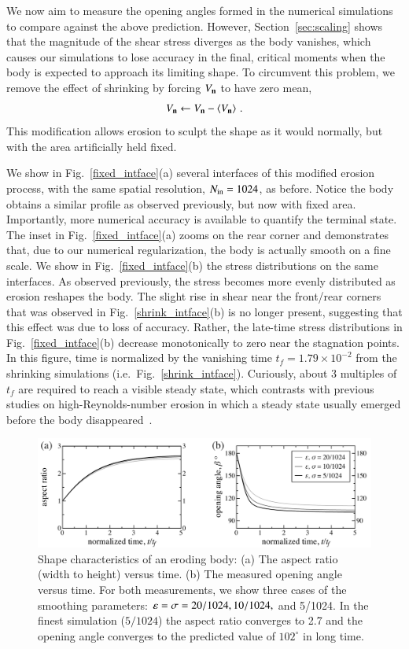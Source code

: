 \documentclass[preprint, 10pt]{elsarticle}
\begin{document}
We now aim to measure the opening angles formed in the numerical simulations to compare against the above prediction. However, Section~\ref{sec:scaling} shows that the magnitude of the shear stress diverges as the body vanishes, which causes our simulations to lose accuracy in the final, critical moments when the body is expected to approach its limiting shape. To circumvent this problem, we remove the effect of shrinking by forcing $V_{\mathbf{n}}$ to have zero mean,
\begin{align}
V_{\mathbf{n}} \leftarrow V_{\mathbf{n}} - \left< V_{\mathbf{n}} \right> \, .
\end{align}
This modification allows erosion to sculpt the shape as it would normally, but with the area artificially held fixed.

We show in Fig.~\ref{fixed_intface}(a) several interfaces of this modified erosion process, with the same spatial resolution, $N_{\mathrm{in}} = 1024$, as before. Notice the body obtains a similar profile as observed previously, but now with fixed area. Importantly, more numerical accuracy is available to quantify the terminal state. The inset in Fig.~\ref{fixed_intface}(a) zooms on the rear corner and demonstrates that, due to our numerical regularization, the body is actually smooth on a fine scale. We show in Fig.~\ref{fixed_intface}(b) the stress distributions on the same interfaces. As observed previously, the stress becomes more evenly distributed as erosion reshapes the body. The slight rise in shear near the front/rear corners that was observed in Fig.~\ref{shrink_intface}(b) is no longer present, suggesting that this effect was due to loss of accuracy. Rather, the late-time stress distributions in Fig.~\ref{fixed_intface}(b) decrease monotonically to zero near the stagnation points. In this figure, time is normalized by the vanishing time $t_f = 1.79 \times 10^{-2}$ from the shrinking simulations (i.e.~Fig.~\ref{shrink_intface}). Curiously, about 3 multiples of $t_f$ are required to reach a visible steady state, which contrasts with previous studies on high-Reynolds-number erosion in which a steady state usually emerged before the body disappeared~\cite{moo-ris-chi-zha-she2013}.  
\begin{figure}%
\begin{center}
\includegraphics[width = 0.85 \textwidth]{./figs/arangle.pdf}
\caption{Shape characteristics of an eroding body: (a) The aspect ratio (width to height) versus time. (b) The measured opening angle versus time. For both measurements, we show three cases of the smoothing parameters: $\varepsilon = \sigma = 20/1024, 10/1024,$ and 5/1024. In the finest simulation ($5/1024$) the aspect ratio converges to 2.7 and the opening angle converges to the predicted value of $102^{\circ}$ in long time.}
\label{fig:arangle}
\end{center}
\end{figure}
\end{document}
